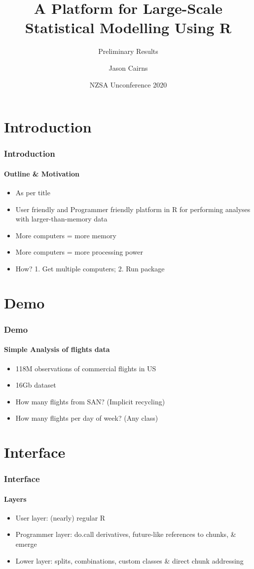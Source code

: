 \documentclass{beamer}
\title{A Platform for Large-Scale Statistical Modelling Using R}
\subtitle{Preliminary Results}
\author{Jason Cairns}
\institute{University of Auckland}
\date{NZSA Unconference 2020}
\begin{document}
\frame{\titlepage}

\section{Introduction}
	\begin{frame}
		\frametitle{Introduction}
		\framesubtitle{Outline \& Motivation}
		\begin{itemize}
			\item As per title
			\item User friendly and Programmer friendly platform in R for performing analyses with larger-than-memory data
			\item More computers = more memory
			\item More computers = more processing power
			\item How? 1. Get multiple computers; 2. Run package
		\end{itemize}
	\end{frame}
\section{Demo}
	\begin{frame}
		\frametitle{Demo}
		\framesubtitle{Simple Analysis of flights data}
		\begin{itemize}
			\item 118M observations of commercial flights in US
			\item 16Gb dataset
			\item How many flights from SAN? (Implicit recycling)
			\item How many flights per day of week? (Any class)
		\end{itemize}
	\end{frame}
\section{Interface}
	\begin{frame}
		\frametitle{Interface}
		\framesubtitle{Layers}
		\begin{itemize}
			\item User layer: (nearly) regular R
			\item Programmer layer: do.call derivatives, future-like references to chunks, \& emerge
			\item Lower layer: splits, combinations, custom classes \& direct chunk addressing
		\end{itemize}
	\end{frame}
\end{document}

